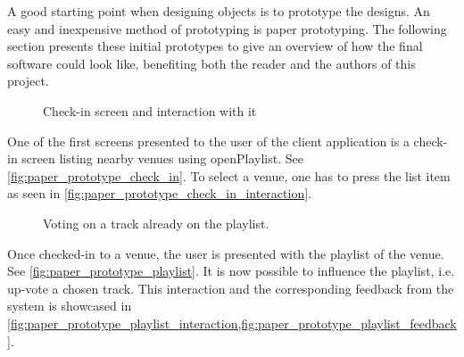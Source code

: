 \label{paper_prototype} 
A good starting point when designing objects is to prototype the
designs. An easy and inexpensive method of prototyping is paper
prototyping. The following section presents these initial prototypes
to give an overview of how the final software could look like,
benefiting both the reader and the authors of this project.

\begin{figure}[H]
  \centering
  \caption{Check-in screen and interaction with it}
\end{figure}

One of the first screens presented to the user of the client
application is a check-in screen listing nearby venues using
openPlaylist. See \cref{fig:paper_prototype_check_in}. To select a
venue, one has to press the list item as seen in \cref{fig:paper_prototype_check_in_interaction}.

\begin{figure}[H]
  \centering
  \caption{Voting on a track already on the playlist.}
\end{figure}

Once checked-in to a venue, the user is presented with the playlist of
the venue. See \cref{fig:paper_prototype_playlist}. It is now possible
to influence the playlist, i.e. up-vote a chosen track. This
interaction and the corresponding feedback from the system is showcased in
\cref{fig:paper_prototype_playlist_interaction,fig:paper_prototype_playlist_feedback}.

